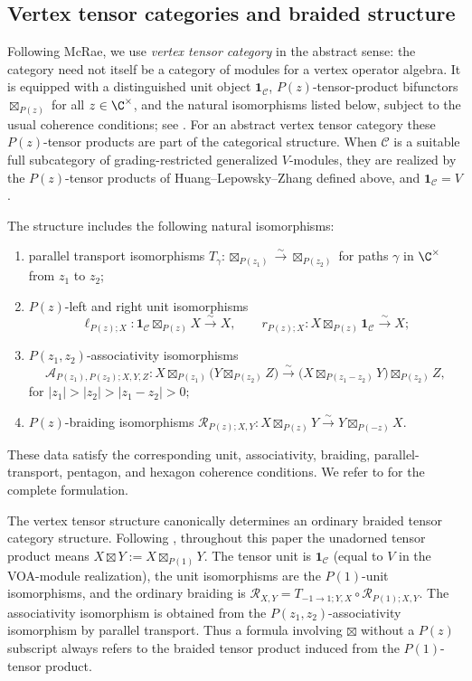 \documentclass[12pt,leqno]{amsart}
\numberwithin{equation}{section} \newtheorem{thm}{Theorem}[section] \newtheorem{lem}[thm]{Lemma} \newtheorem{ex}[thm]{Example} \newtheorem{prop}[thm]{Proposition} \newtheorem{cor}[thm]{Corollary} \newtheorem{defi}[thm]{Definition} \newtheorem{rmk}[thm]{Remark} \newtheorem{notation}[thm]{Notation}
\begin{document}
\subsection{Vertex tensor categories and braided structure}

Following McRae, we use \emph{vertex tensor category} in the abstract sense: the category need not itself be a category of modules for a vertex operator algebra. It is equipped with a distinguished unit object $\mathbf 1_{\mathcal C}$, $P(z)$-tensor-product bifunctors $\boxtimes_{P(z)}$ for all $z\in\C^\times$, and the natural isomorphisms listed below, subject to the usual coherence conditions; see \cite[\S2.1]{McRae}. For an abstract vertex tensor category these $P(z)$-tensor products are part of the categorical structure. When $\mathcal C$ is a suitable full subcategory of grading-restricted generalized $V$-modules, they are realized by the $P(z)$-tensor products of Huang--Lepowsky--Zhang defined above, and $\mathbf 1_{\mathcal C}=V$.

The structure includes the following natural isomorphisms:
\begin{enumerate}[label=\textnormal{(\roman*)}]
\item parallel transport isomorphisms
\(T_\gamma:\boxtimes_{P(z_1)}\overset{\sim}{\longrightarrow}\boxtimes_{P(z_2)}\) for paths $\gamma$ in $\C^\times$ from $z_1$ to $z_2$;

\item $P(z)$-left and right unit isomorphisms
\[
\ell_{P(z);X}:
\mathbf 1_{\mathcal C}\boxtimes_{P(z)}X
\overset{\sim}{\longrightarrow}
X,
\qquad
r_{P(z);X}:
X\boxtimes_{P(z)}\mathbf 1_{\mathcal C}
\overset{\sim}{\longrightarrow}
X;
\]

\item $P(z_1,z_2)$-associativity isomorphisms
\[
\mathcal A_{P(z_1),P(z_2);X,Y,Z}:
X\boxtimes_{P(z_1)}
\bigl(Y\boxtimes_{P(z_2)}Z\bigr)
\overset{\sim}{\longrightarrow}
\bigl(X\boxtimes_{P(z_1-z_2)}Y\bigr)
\boxtimes_{P(z_2)}Z,
\]
for \(|z_1|>|z_2|>|z_1-z_2|>0;\)
\item $P(z)$-braiding isomorphisms
\(\mathcal R_{P(z);X,Y}:X\boxtimes_{P(z)}Y\overset{\sim}{\longrightarrow}Y\boxtimes_{P(-z)}X.\)
\end{enumerate}
These data satisfy the corresponding unit, associativity, braiding, parallel-transport, pentagon, and hexagon coherence conditions. We refer to \cite[\S2.1]{McRae} for the complete formulation.

The vertex tensor structure canonically determines an ordinary braided tensor category structure. Following \cite[\S2.1]{McRae}, throughout this paper the unadorned tensor product means \(X\boxtimes Y:=X\boxtimes_{P(1)}Y.\) The tensor unit is $\mathbf 1_{\mathcal C}$ (equal to $V$ in the VOA-module realization), the unit isomorphisms are the $P(1)$-unit isomorphisms, and the ordinary braiding is \(\mathcal R_{X,Y}=T_{-1\to1;Y,X}\circ\mathcal R_{P(1);X,Y}.\) The associativity isomorphism is obtained from the $P(z_1,z_2)$-associativity isomorphism by parallel transport. Thus a formula involving $\boxtimes$ without a $P(z)$ subscript always refers to the braided tensor product induced from the $P(1)$-tensor product.
\end{document}
